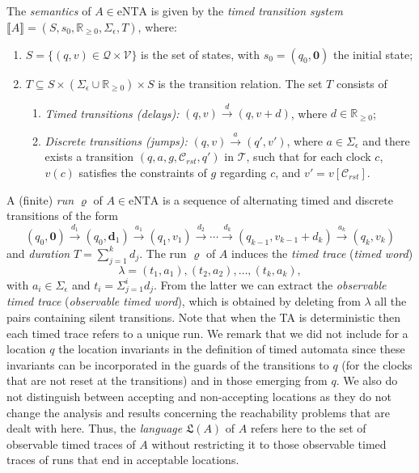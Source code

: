 \documentclass[11pt]{amsart}
\theoremstyle{definition}
\newcommand{\LLL}{\mathfrak{L}}
\newcommand{\ntaeps}{\mathrm{eNTA}}
\newcommand{\eActions}{\Sigma_{\epsilon}}
\newcommand{\Locs}{\mathcal{Q}}
\newcommand{\ResetClocks}{\mathcal{C}_{rst}}
\newcommand{\Trans}{\mathcal{T}}
\newcommand{\ClockVal}{\mathcal{V}}
\newcommand{\zerov}{\textbf{0}}
\newcommand{\PReals}{\mathbb{R}_{\geq 0}}
\begin{document}
The \emph{semantics} of $A \in \ntaeps$ is given by the \emph{timed transition system}
$\llbracket A \rrbracket = (S, s_0, \PReals, \eActions, T)$, where:
\begin{enumerate}
\item $S = \{(q,v) \in \Locs \times \ClockVal \}$ is the set of states, with
$s_0 = (q_0, \zerov)$ the initial state;
\item $T \subseteq S \times (\eActions \cup \PReals) \times S$ is the transition relation.
The set $T$ consists of
\begin{enumerate}
\item \emph{Timed transitions (delays):} $(q,v) \xrightarrow{d} (q, v+d)$, where $d \in \PReals$;
\item \emph{Discrete transitions (jumps):} $(q,v) \xrightarrow{a} (q',v')$, where $a \in \eActions$ and there exists a transition $(q, a, g, \ResetClocks, q')$ in $\Trans$, such that for each clock $c$, $v(c)$ satisfies the constraints of $g$ regarding $c$, and $v' = v[\ResetClocks]$.
\end{enumerate}
\end{enumerate}

A (finite) \emph{run} $\varrho$ of $A \in \ntaeps$ is a sequence of alternating timed and discrete transitions of the form 
$$(q_{0}, \zerov) \xrightarrow{d_{1}} (q_{0}, \textbf{d}_1) \xrightarrow{a_{1}} (q_{1}, v_{1}) \xrightarrow{d_{2}} \cdots 
\xrightarrow{d_{k}} (q_{k-1}, v_{k-1} + d_{k}) \xrightarrow{a_{k}} (q_{k}, v_{k})
$$
and \emph{duration} $T=\sum_{j=1}^{k}d_j$.
The run $\varrho$ of $A$ induces the \emph{timed trace} (\emph{timed word})
$$
\lambda = (t_{1}, a_{1}), (t_{2}, a_{2}), \ldots, (t_{k}, a_{k}),
$$
with $a_i \in \eActions$ and $t_{i} = \Sigma_{j=1}^{i} d_j$. 
From the latter we can extract the \emph{observable timed trace} (\emph{observable timed word}), which is obtained by deleting from $\lambda$ all the pairs containing silent transitions.
Note that when the TA is deterministic then each timed trace refers to a unique run.
We remark that we did not include for a location $q$ the location invariants in the definition of timed automata since these invariants can be incorporated in the guards of the transitions to $q$ (for the clocks that are not reset at the transitions) and in those emerging from $q$.
We also do not distinguish between accepting and non-accepting locations as they do not change the analysis and results concerning the reachability problems that are dealt with here.
Thus, the \emph{language} $\LLL(A)$ of $A$ refers here to the set of observable timed traces of $A$ without restricting it to those observable timed traces of runs that end in acceptable locations.
\end{document}
